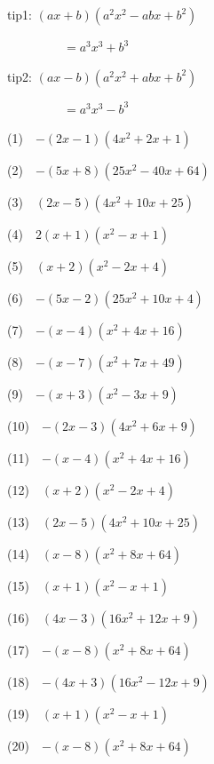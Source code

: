 \documentclass[a4j,twocolumn,10pt,fleqn]{jarticle}
\begin{document}
tip1: $\left(a x + b\right) \left(a^{2} x^{2} - a b x + b^{2}\right)$

~~~~~~~~~$=a^{3} x^{3} + b^{3}$


tip2: $\left(a x - b\right) \left(a^{2} x^{2} + a b x + b^{2}\right)$

~~~~~~~~~$=a^{3} x^{3} - b^{3}$


(1)~~$-\left(2 x - 1\right) \left(4 x^{2} + 2 x + 1\right)$

(2)~~$-\left(5 x + 8\right) \left(25 x^{2} - 40 x + 64\right)$

(3)~~$\left(2 x - 5\right) \left(4 x^{2} + 10 x + 25\right)$

(4)~~$2\left(x + 1\right) \left(x^{2} - x + 1\right)$

(5)~~$\left(x + 2\right) \left(x^{2} - 2 x + 4\right)$

(6)~~$-\left(5 x - 2\right) \left(25 x^{2} + 10 x + 4\right)$

(7)~~$-\left(x - 4\right) \left(x^{2} + 4 x + 16\right)$

(8)~~$-\left(x - 7\right) \left(x^{2} + 7 x + 49\right)$

(9)~~$-\left(x + 3\right) \left(x^{2} - 3 x + 9\right)$

(10)~~$-\left(2 x - 3\right) \left(4 x^{2} + 6 x + 9\right)$

(11)~~$-\left(x - 4\right) \left(x^{2} + 4 x + 16\right)$

(12)~~$\left(x + 2\right) \left(x^{2} - 2 x + 4\right)$

(13)~~$\left(2 x - 5\right) \left(4 x^{2} + 10 x + 25\right)$

(14)~~$\left(x - 8\right) \left(x^{2} + 8 x + 64\right)$

(15)~~$\left(x + 1\right) \left(x^{2} - x + 1\right)$

(16)~~$\left(4 x - 3\right) \left(16 x^{2} + 12 x + 9\right)$

(17)~~$-\left(x - 8\right) \left(x^{2} + 8 x + 64\right)$

(18)~~$-\left(4 x + 3\right) \left(16 x^{2} - 12 x + 9\right)$

(19)~~$\left(x + 1\right) \left(x^{2} - x + 1\right)$

(20)~~$-\left(x - 8\right) \left(x^{2} + 8 x + 64\right)$
\end{document}
